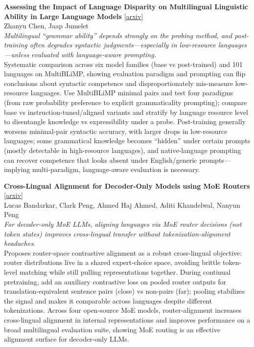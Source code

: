 \documentclass[12pt,letterpaper]{article}
\begin{document}
\medskip

{\small\textbf{Assessing the Impact of Language Disparity on Multilingual Linguistic Ability in Large Language Models}} {\scriptsize[\href{https://arxiv.org/abs/2610.00540}{arxiv}]}\\
{\scriptsize Zhanyu Chen, Jaap Jumelet}\\

{\small\textit{Multilingual ``grammar ability'' depends strongly on the probing method, and post-training often degrades syntactic judgments---especially in low-resource languages---unless evaluated with language-aware prompting.}}\\[1pt]
{\footnotesize Systematic comparison across six model families (base vs post-trained) and 101 languages on MultiBLiMP, showing evaluation paradigm and prompting can flip conclusions about syntactic competence and disproportionately mis-measure low-resource languages. Use MultiBLiMP minimal pairs and test four paradigms (from raw probability preference to explicit grammaticality prompting); compare base vs instruction-tuned/aligned variants and stratify by language resource level to disentangle knowledge vs expressibility under a probe. Post-training generally worsens minimal-pair syntactic accuracy, with larger drops in low-resource languages; some grammatical knowledge becomes ``hidden'' under certain prompts (mostly detectable in high-resource languages), and native-language prompting can recover competence that looks absent under English/generic prompts---implying multi-paradigm, language-aware evaluation is necessary.}

\medskip

{\small\textbf{Cross-Lingual Alignment for Decoder-Only Models using MoE Routers}} {\scriptsize[\href{https://arxiv.org/abs/2610.01921}{arxiv}]}\\
{\scriptsize Lucas Bandarkar, Clark Peng, Ahmed Haj Ahmed, Aditi Khandelwal, Nanyun Peng}\\

{\small\textit{For decoder-only MoE LLMs, aligning languages via MoE router decisions (not token states) improves cross-lingual transfer without tokenization-alignment headaches.}}\\[1pt]
{\footnotesize Proposes router-space contrastive alignment as a robust cross-lingual objective: router distributions live in a shared expert-choice space, avoiding brittle token-level matching while still pulling representations together. During continual pretraining, add an auxiliary contrastive loss on pooled router outputs for translation-equivalent sentence pairs (close) vs non-pairs (far); pooling stabilizes the signal and makes it comparable across languages despite different tokenizations. Across four open-source MoE models, router-alignment increases cross-lingual alignment in internal representations and improves performance on a broad multilingual evaluation suite, showing MoE routing is an effective alignment surface for decoder-only LLMs.}
\end{document}
